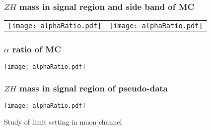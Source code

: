\documentclass[aspectratio=169]{beamer}
\begin{document}
\begin{frame}
  \frametitle{$ZH$ mass in signal region and side band of MC}
  \begin{center}
    \begin{tabular}{ll}
      \texttt{[image: alphaRatio.pdf]} &
      \texttt{[image: alphaRatio.pdf]} \\
    \end{tabular}
  \end{center}
\end{frame}
\begin{frame}
  \frametitle{$\alpha$ ratio of MC}
  \begin{center}
    \texttt{[image: alphaRatio.pdf]}
  \end{center}
\end{frame}
\begin{frame}
  \frametitle{$ZH$ mass in signal region of pseudo-data}
  \begin{center}
    \texttt{[image: alphaRatio.pdf]}
  \end{center}
\end{frame}
\begin{frame}
  \LARGE{\centerline{Study of limit setting in muon channel}}
\end{frame}
\renewcommand{\arraystretch}{1.2}
\end{document}
